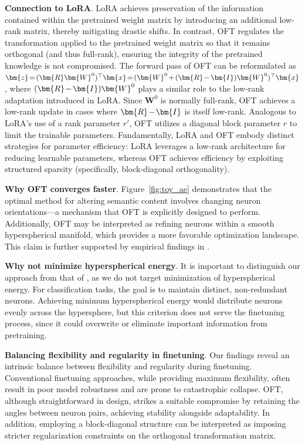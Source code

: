 \textbf{Connection to LoRA}. LoRA achieves preservation of the information contained within the pretrained weight matrix by introducing an additional low-rank matrix, thereby mitigating drastic shifts. In contrast, OFT regulates the transformation applied to the pretrained weight matrix so that it remains orthogonal (and thus full-rank), ensuring the integrity of the pretrained knowledge is not compromised. The forward pass of OFT can be reformulated as $\thickmuskip=2mu \medmuskip=2mu \bm{z}=(\bm{R}\bm{W}^0)^\top\bm{x}=(\bm{W}^0+(\bm{R}-\bm{I})\bm{W}^0)^\top\bm{x}$, where $\thickmuskip=2mu \medmuskip=2mu (\bm{R}-\bm{I})\bm{W}^0$ plays a similar role to the low-rank adaptation introduced in LoRA. Since $\bm{W}^0$ is normally full-rank, OFT achieves a low-rank update in cases where $\thickmuskip=2mu \medmuskip=2mu \bm{R}-\bm{I}$ is itself low-rank. Analogous to LoRA’s use of a rank parameter $r'$, OFT utilizes a diagonal block parameter $r$ to limit the trainable parameters. Fundamentally, LoRA and OFT embody distinct strategies for parameter efficiency: LoRA leverages a low-rank architecture for reducing learnable parameters, whereas OFT achieves efficiency by exploiting structured sparsity (specifically, block-diagonal orthogonality).

\textbf{Why OFT converges faster}. Figure~\ref{fig:toy_ae} demonstrates that the optimal method for altering semantic content involves changing neuron orientations—a mechanism that OFT is explicitly designed to perform. Additionally, OFT may be interpreted as refining neurons within a smooth hyperspherical manifold, which provides a more favorable optimization landscape. This claim is further supported by empirical findings in \cite{liu2021orthogonal}.

\textbf{Why not minimize hyperspherical energy}. It is important to distinguish our approach from that of \cite{liu2021orthogonal}, as we do not target minimization of hyperspherical energy. For classification tasks, the goal is to maintain distinct, non-redundant neurons. Achieving minimum hyperspherical energy would distribute neurons evenly across the hypersphere, but this criterion does not serve the finetuning process, since it could overwrite or eliminate important information from pretraining.

\textbf{Balancing flexibility and regularity in finetuning}. Our findings reveal an intrinsic balance between flexibility and regularity during finetuning. Conventional finetuning approaches, while providing maximum flexibility, often result in poor model robustness and are prone to catastrophic collapse. OFT, although straightforward in design, strikes a suitable compromise by retaining the angles between neuron pairs, achieving stability alongside adaptability. In addition, employing a block-diagonal structure can be interpreted as imposing stricter regularization constraints on the orthogonal transformation matrix.

